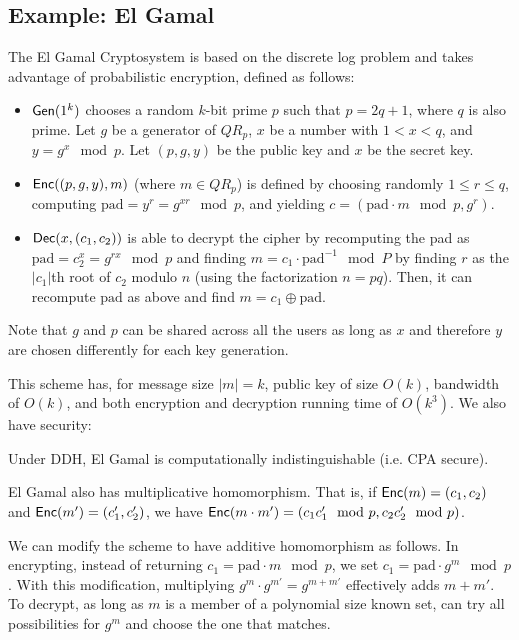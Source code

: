 \documentclass[10pt]{article}
\begin{document}
\subsection{Example: El Gamal}

The El Gamal Cryptosystem \cite{ElGamal} is based on the discrete log problem and takes advantage of probabilistic encryption, defined as follows:
\begin{itemize}
	\item $\mathsf{Gen}(1^k)$ chooses a random $k$-bit prime $p$ such that $p=2q+1$, where $q$ is also prime. Let $g$ be a generator of $QR_p$, $x$ be a number with $1 < x < q$, and $y = g^x \mod p$. Let $(p,g,y)$ be the public key and $x$ be the secret key.
	\item $\mathsf{Enc}((p,g,y),m)$ (where $m \in QR_p$) is defined by choosing randomly $1 \le r \le q$, computing $\text{pad} = y^r = g^{xr} \mod p$, and yielding $c = (\text{pad} \cdot m \mod p, g^{r})$.
	\item $\mathsf{Dec}(x,(c_1, c_2))$ is able to decrypt the cipher by recomputing the pad as $\text{pad} = c_2^x = g^{rx} \mod p$ and finding $m = c_1 \cdot \text{pad}^{-1} \mod P$ by finding $r$ as the $|c_1|$th root of $c_2$ modulo $n$ (using the factorization $n=pq$). Then, it can recompute $\text{pad}$ as above and find $m = c_1 \oplus \text{pad}$.
\end{itemize}
Note that $g$ and $p$ can be shared across all the users as long as $x$ and therefore $y$ are chosen differently for each key generation. 

This scheme has, for message size $|m| = k$, public key of size $O(k)$, bandwidth of $O(k)$, and both encryption and decryption running time of $O(k^3)$. We also have security:
\begin{theorem}
Under DDH, El Gamal is computationally indistinguishable (i.e. CPA secure).
\end{theorem}

El Gamal also has multiplicative homomorphism. That is, if $\mathsf{Enc}(m) = (c_1, c_2)$ and $\mathsf{Enc}(m') = (c_1', c_2')$, we have $\mathsf{Enc}(m \cdot m') = (c_1c_1' \mod p, c_2c_2' \mod p)$. 

We can modify the scheme to have additive homomorphism as follows. In encrypting, instead of returning $c_1 = \text{pad} \cdot m \mod p$, we set $c_1 = \text{pad} \cdot g^m \mod p$. With this modification, multiplying $g^m \cdot g^{m'} = g^{m+m'}$ effectively adds $m+m'$. To decrypt, as long as $m$ is a member of a polynomial size known set, can try all possibilities for $g^m$ and choose the one that matches.
\end{document}
